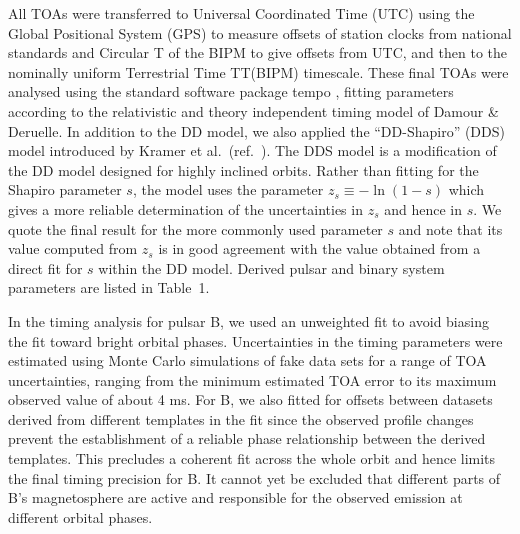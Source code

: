 \documentclass[12pt,psfig]{article}
\begin{document}
All TOAs were transferred to Universal Coordinated Time (UTC) using the Global
Positional System (GPS) to measure offsets of station clocks from national
standards and Circular T of the BIPM to give offsets from UTC, and then to the
nominally uniform Terrestrial Time TT(BIPM) timescale. These final TOAs were
analysed using the standard software package {\sc tempo} \cite{tempo}, 
fitting parameters
according to the relativistic and theory independent timing model of Damour \&
Deruelle\cite{dd85,dd86}.  In addition to the DD model, we also applied the
``DD-Shapiro'' (DDS) model introduced by Kramer et al.~(ref.~\cite{ksm+06a}).
The DDS model is a modification of the DD model designed for highly inclined
orbits. Rather than fitting for the Shapiro parameter $s$, the model uses the
parameter $z_s \equiv -\ln(1-s)$ which gives a more reliable determination of
the uncertainties in $z_s$ and hence in $s$.  We quote the final result for
the more commonly used parameter $s$ and note that its value computed from
$z_s$ is in good agreement with the value obtained from a direct fit for $s$
within the DD model. Derived pulsar and binary system parameters are listed in
Table~1.

In the timing analysis for pulsar B, we used an unweighted fit to avoid
biasing the fit toward bright orbital phases. Uncertainties in the timing
parameters were estimated using Monte Carlo simulations of fake data sets for
a range of TOA uncertainties, ranging from the minimum estimated TOA error to
its maximum observed value of about 4 ms. For B, we also fitted for offsets
between datasets derived from different templates in the fit since the
observed profile changes prevent the establishment of a reliable phase
relationship between the derived templates.  This precludes a coherent fit
across the whole orbit and hence limits the final timing precision for B.  It
cannot yet be excluded that different parts of B's magnetosphere are active
and responsible for the observed emission at different orbital phases.
\end{document}
